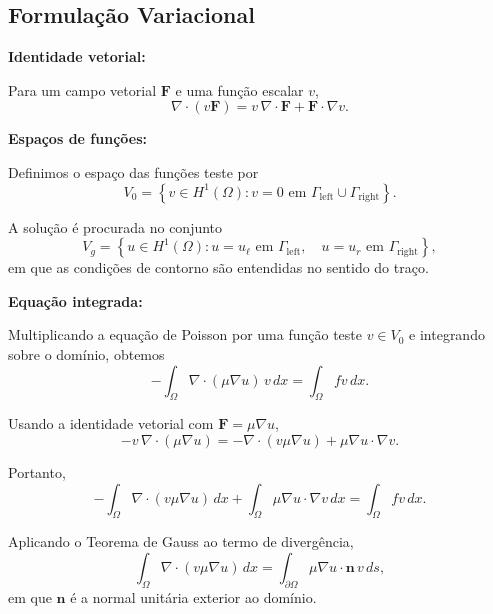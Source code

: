 \documentclass{article}
\begin{document}
\subsection*{Formulação Variacional}

\noindent \textbf{Identidade vetorial:}

Para um campo vetorial $\mathbf{F}$ e uma função escalar $v$,
\begin{equation*}
	\nabla\cdot(v\mathbf{F})
	=
	v\,\nabla\cdot\mathbf{F}
	+
	\mathbf{F}\cdot\nabla v.
\end{equation*}

\noindent \textbf{Espaços de funções:}

Definimos o espaço das funções teste por
\begin{equation*}
	V_0
	=
	\left\{
	v\in H^1(\Omega):
	v=0 \text{ em }
	\Gamma_{\mathrm{left}}\cup\Gamma_{\mathrm{right}}
	\right\}.
\end{equation*}

A solução é procurada no conjunto
\begin{equation*}
	V_g
	=
	\left\{
	u\in H^1(\Omega):
	u=u_\ell \text{ em }\Gamma_{\mathrm{left}},
	\quad
	u=u_r \text{ em }\Gamma_{\mathrm{right}}
	\right\},
\end{equation*}
em que as condições de contorno são entendidas no sentido do traço.

\noindent \textbf{Equação integrada:}

Multiplicando a equação de Poisson por uma função teste $v\in V_0$
e integrando sobre o domínio, obtemos
\begin{equation}
	-\int_\Omega
	\nabla\cdot(\mu\nabla u)\,v\,dx
	=
	\int_\Omega fv\,dx.
	\label{eq:poisson-integrada}
\end{equation}

Usando a identidade vetorial com $\mathbf{F}=\mu\nabla u$,
\begin{equation*}
	-v\,\nabla\cdot(\mu\nabla u)
	=
	-\nabla\cdot(v\mu\nabla u)
	+
	\mu\nabla u\cdot\nabla v.
\end{equation*}

Portanto,
\begin{equation*}
	-\int_\Omega
	\nabla\cdot(v\mu\nabla u)\,dx
	+
	\int_\Omega
	\mu\nabla u\cdot\nabla v\,dx
	=
	\int_\Omega fv\,dx.
\end{equation*}

Aplicando o Teorema de Gauss ao termo de divergência,
\begin{equation*}
	\int_\Omega
	\nabla\cdot(v\mu\nabla u)\,dx
	=
	\int_{\partial\Omega}
	\mu\nabla u\cdot\mathbf{n}\,v\,ds,
\end{equation*}
em que $\mathbf{n}$ é a normal unitária exterior ao domínio.
\end{document}
